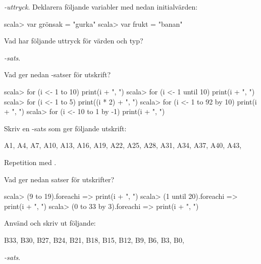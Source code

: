 {{{{\Task {}\textit{-uttryck}. Deklarera följande variabler med nedan initialvärden:  %

\begin{REPLnonum}
scala> var grönsak = "gurka"
scala> var frukt = "banan"
\end{REPLnonum}

Vad har följande uttryck för värden och typ?

\Subtask {}

\Subtask {}

\Subtask {}

\Subtask {}

\Subtask {}


\Task {}\textit{-sats}.  %

\Subtask Vad ger nedan -satser för utskrift?

\begin{REPL}
scala> for (i <- 1 to 10) print(i + ", ")
scala> for (i <- 1 until 10) print(i + ", ")
scala> for (i <- 1 to 5) print((i * 2) + ", ")
scala> for (i <- 1 to 92 by 10) print(i + ", ")
scala> for (i <- 10 to 1 by -1) print(i + ", ")
\end{REPL}

\Subtask Skriv en -sats som ger följande utskrift:
\begin{REPLnonum}
A1, A4, A7, A10, A13, A16, A19, A22, A25, A28, A31, A34, A37, A40, A43, 
\end{REPLnonum}

\Task Repetition med .  %

\Subtask Vad ger nedan satser för utskrifter?

\begin{REPL}
scala> (9 to 19).foreach{i => print(i + ", ")}
scala> (1 until 20).foreach{i => print(i + ", ")}
scala> (0 to 33 by 3).foreach{i => print(i + ", ")}
\end{REPL}

\Subtask Använd  och skriv ut följande:
\begin{REPLnonum}
B33, B30, B27, B24, B21, B18, B15, B12, B9, B6, B3, B0, 
\end{REPLnonum}

\Task {}\textit{-sats}.   %

}}}}
